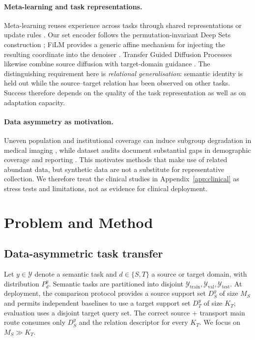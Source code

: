 \documentclass{article}
\newcommand{\KT}{K_T}
\newcommand{\MS}{M_S}
\newcommand{\Ttrain}{\mathcal{Y}_{\mathrm{train}}}
\newcommand{\Tval}{\mathcal{Y}_{\mathrm{val}}}
\newcommand{\Ttest}{\mathcal{Y}_{\mathrm{test}}}
\begin{document}
\paragraph{Meta-learning and task representations.}
Meta-learning reuses experience across tasks through shared representations or update rules \citep{finn2017maml}. Our set encoder follows the permutation-invariant Deep Sets construction \citep{zaheer2017deepsets}; FiLM provides a generic affine mechanism for injecting the resulting coordinate into the denoiser \citep{perez2018film}. Transfer Guided Diffusion Processes likewise combine source diffusion with target-domain guidance \citep{ouyang2024tgdp}. The distinguishing requirement here is \emph{relational generalisation}: semantic identity is held out while the source--target relation has been observed on other tasks. Success therefore depends on the quality of the task representation as well as on adaptation capacity.

\paragraph{Data asymmetry as motivation.}
Uneven population and institutional coverage can induce subgroup degradation in medical imaging \citep{larrazabal2020gender,seyyedkalantari2021underdiagnosis,daneshjou2022ddi}, while dataset audits document substantial gaps in demographic coverage and reporting \citep{daneshjou2021transparency,wen2022skindatasets}. This motivates methods that make use of related abundant data, but synthetic data are not a substitute for representative collection. We therefore treat the clinical studies in Appendix~\ref{app:clinical} as stress tests and limitations, not as evidence for clinical deployment.

\section{Problem and Method}
\label{sec:method}
\subsection{Data-asymmetric task transfer}
Let $y\in\mathcal{Y}$ denote a semantic task and $d\in\{S,T\}$ a source or target domain, with distribution $P_d^y$. Semantic tasks are partitioned into disjoint $\Ttrain,\Tval,\Ttest$. At deployment, the comparison protocol provides a source support set $D_S^y$ of size $\MS$ and permits independent baselines to use a target support set $D_T^y$ of size $\KT$; evaluation uses a disjoint target query set. The correct source $+$ transport main route consumes only $D_S^y$ and the relation descriptor for every $\KT$. We focus on $\MS\gg\KT$.
\end{document}
